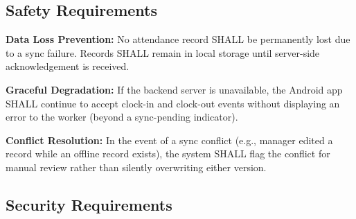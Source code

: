 \documentclass[12pt, a4paper]{article}
\begin{document}
\subsection{Safety Requirements}

\begin{description}[leftmargin=2.5cm, style=nextline]
    \item[NFR-06]
        \textbf{Data Loss Prevention:} No attendance record SHALL be
        permanently lost due to a sync failure. Records SHALL remain in
        local storage until server-side acknowledgement is received.
    \item[NFR-07]
        \textbf{Graceful Degradation:} If the backend server is
        unavailable, the Android app SHALL continue to accept clock-in
        and clock-out events without displaying an error to the worker
        (beyond a sync-pending indicator).
    \item[NFR-08]
        \textbf{Conflict Resolution:} In the event of a sync conflict
        (e.g., manager edited a record while an offline record exists),
        the system SHALL flag the conflict for manual review rather than
        silently overwriting either version.
\end{description}

\subsection{Security Requirements}
\end{document}
